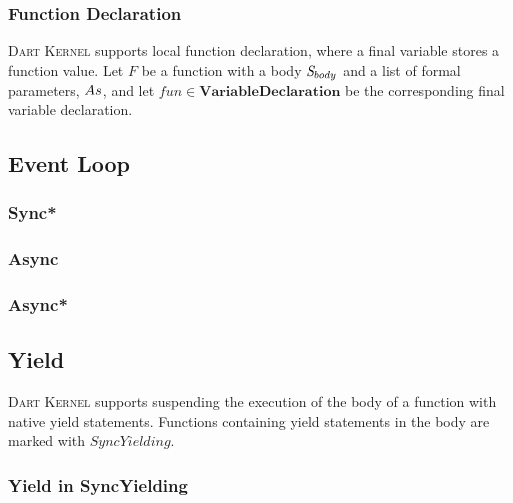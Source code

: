 \documentclass[a4paper,oneside,fleqn]{article}
\newcommand{\kernel}{\textsc{Dart Kernel}}
\newcommand{\dvardecl}{\mathbf{VariableDeclaration}}
\begin{document}
\subsubsection{Function Declaration}

\kernel{} supports local function declaration, where a final variable stores a function value.
Let $F$ be a function with a body $\mathit{S}_{body}$ and a list of formal parameters, $As$, and let $fun \in \dvardecl$ be the corresponding final variable declaration.


\subsection{Event Loop}
\label{subsec:eventloop}


\subsubsection{Sync*}
\label{subsubsec:syncstar}


\subsubsection{Async}
\label{subsubsec:async}


\subsubsection{Async*}
\label{subsubsec:asyncstar}


\subsection{Yield}

\kernel{} supports suspending the execution of the body of a function with native yield statements.
Functions containing yield statements in the body are marked with $SyncYielding$.


\subsubsection{Yield in SyncYielding}
\label{subsubsec:yield-in-syncyelding}
\end{document}

